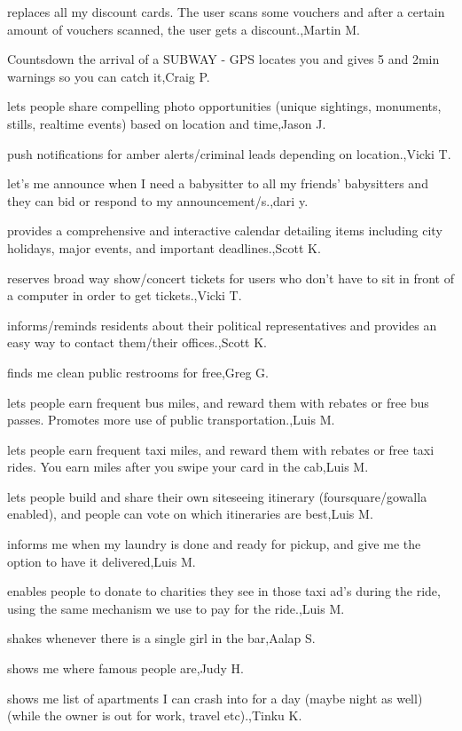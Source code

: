 \documentclass{article}
\begin{document}
replaces all my discount cards. The user scans some vouchers and after a certain amount of vouchers scanned, the user gets a discount.,Martin M.

Countsdown the arrival of a SUBWAY - GPS locates you and gives 5 and 2min warnings so you can catch it,Craig P.

lets people share compelling photo opportunities (unique sightings, monuments, stills, realtime events) based on location and time,Jason J.

push notifications for amber alerts/criminal leads depending on location.,Vicki T.

let's me announce when I need a babysitter to all my friends' babysitters and they can bid or respond to my announcement/s.,dari y.

provides a comprehensive and interactive calendar detailing items including city holidays, major events, and important deadlines.,Scott K.

reserves broad way show/concert tickets for users who don't have to sit in front of a computer in order to get tickets.,Vicki T.

informs/reminds residents about their political representatives and provides an easy way to contact them/their offices.,Scott K.

finds me clean public restrooms for free,Greg  G.

lets people earn frequent bus miles, and reward them with rebates or free bus passes. Promotes more use of public transportation.,Luis M.

lets people earn frequent taxi miles, and reward them with rebates or free taxi rides. You earn miles after you swipe your card in the cab,Luis M.

lets people build and share their own siteseeing itinerary (foursquare/gowalla enabled), and people can vote on which itineraries are best,Luis M.

informs me when my laundry is done and ready for pickup, and give me the option to have it delivered,Luis M.

enables people to donate to charities they see in those taxi ad's during the ride, using the same mechanism we use to pay for the ride.,Luis M.

shakes whenever there is a single girl in the bar,Aalap S.

shows me where famous people are,Judy H.

shows me list of apartments I can crash into for a day (maybe night as well) (while the owner is out for work, travel etc).,Tinku K.
\end{document}
